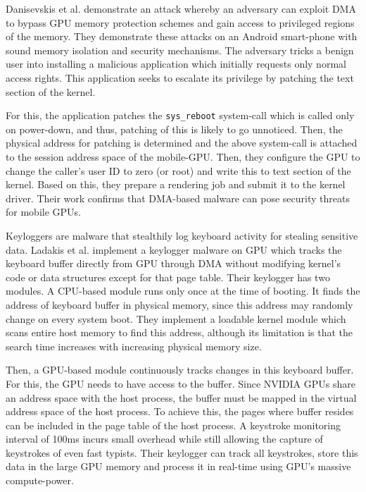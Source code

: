  
Danisevskis et al. \cite{danisevskis2013dark} demonstrate an attack whereby an adversary can exploit DMA to bypass GPU memory protection schemes  and gain access to privileged regions of the memory. They demonstrate these attacks on an Android smart-phone with sound memory isolation and security mechanisms. The adversary tricks a benign user into installing a malicious application which initially requests only normal access rights. This application seeks to escalate its privilege by patching the text section of the kernel. 
 
For this, the application patches the {\tt sys\_reboot} system-call which is called only on power-down, and thus, patching of this is likely to go unnoticed. Then,  the physical address for patching is determined and   the above system-call is attached to the session address space of the mobile-GPU. Then, they configure the GPU to change the caller's user ID to zero (or root) and write this to text section of the kernel. Based on this, they prepare a rendering job and submit it to the kernel driver. Their work confirms that DMA-based malware can pose security threats for mobile GPUs.  



Keyloggers are malware that stealthily log keyboard activity for stealing sensitive data. Ladakis et al. \cite{ladakis2013you} implement a keylogger malware on GPU which tracks the keyboard buffer directly from GPU through DMA without modifying kernel's code or data structures except for that page table. Their keylogger has two modules. A CPU-based module runs only once at the time of booting. It finds the address of keyboard buffer in physical memory, since this address may randomly change on every system boot. They implement a loadable kernel module which scans entire host memory to find this address, although its limitation is that the search time increases with increasing physical memory size. 
  
 
Then, a GPU-based module continuously tracks changes in this keyboard buffer. For this, the GPU needs to have access to the buffer. Since NVIDIA GPUs share an address space with the host process, the buffer must be mapped in the virtual address space of the host process. To achieve this, the pages where buffer resides can be included in the page table of the host process. A keystroke monitoring interval of 100ms incurs small overhead while still allowing  the capture of   keystrokes of even fast typists. Their keylogger can track all keystrokes, store this data in  the large GPU memory and process it in real-time using GPU's massive compute-power.  

 

